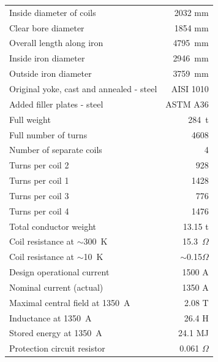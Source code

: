 \begin{table}[h]
 \begin{center}
   \small
   \begin{tabular}{lr}
     \hline
     \hline
       Inside diameter of coils        & 2032 mm \\
       Clear bore diameter             & 1854 mm \\
       Overall length along iron       & 4795~mm \\
       Inside iron diameter            & 2946~mm \\
       Outside iron diameter           & 3759~mm \\
       Original yoke, cast and annealed - steel & AISI 1010 \\
       Added filler plates - steel     & ASTM A36 \\
       Full weight                     & 284~t      \\
       Full number of turns            & 4608 \\
       Number of separate coils        & 4 \\
       Turns per coil 2                &  928 \\   
       Turns per coil 1                & 1428 \\   
       Turns per coil 3                &  776 \\   
       Turns per coil 4                & 1476 \\   
       Total conductor weight          & 13.15 t \\
       Coil resistance at $\sim$300~K & 15.3~$\Omega$ \\   
       Coil resistance at  $\sim$10~K & $\sim$0.15$\Omega$ \\   
       Design operational current      & 1500 A \\
       Nominal current (actual)        & 1350 A \\
       Maximal central field at 1350~A & 2.08 T \\   
       Inductance at 1350~A            & 26.4 H \\
       Stored energy at 1350~A         & 24.1 MJ  \\
       Protection circuit resistor     & 0.061 $\Omega$  \\

\end{tabular}
\end{center}
\end{table}
